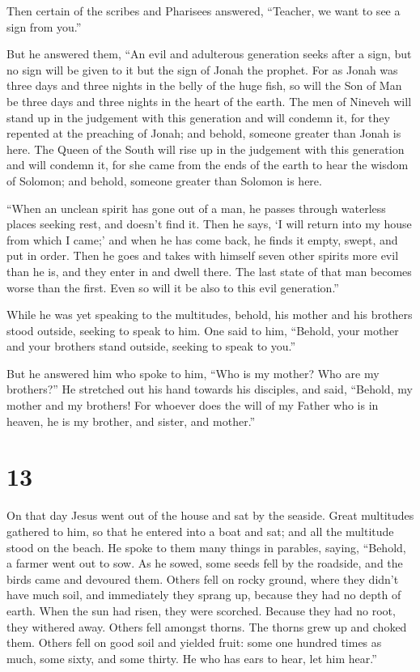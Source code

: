  Then certain of the scribes and Pharisees answered,
``Teacher, we want to see a sign from you.''

 But he answered them, ``An evil and adulterous generation
seeks after a sign, but no sign will be given to it but the sign of
Jonah the prophet.  For as Jonah was three days and three
nights in the belly of the huge fish, so will the Son of Man be three
days and three nights in the heart of the earth.  The men
of Nineveh will stand up in the judgement with this generation and will
condemn it, for they repented at the preaching of Jonah; and behold,
someone greater than Jonah is here.  The Queen of the South
will rise up in the judgement with this generation and will condemn it,
for she came from the ends of the earth to hear the wisdom of Solomon;
and behold, someone greater than Solomon is here.

 ``When an unclean spirit has gone out of a man, he passes
through waterless places seeking rest, and doesn't find it.
 Then he says, `I will return into my house from which I
came;' and when he has come back, he finds it empty, swept, and put in
order.  Then he goes and takes with himself seven other
spirits more evil than he is, and they enter in and dwell there. The
last state of that man becomes worse than the first. Even so will it be
also to this evil generation.''

 While he was yet speaking to the multitudes, behold, his
mother and his brothers stood outside, seeking to speak to him.
 One said to him, ``Behold, your mother and your brothers
stand outside, seeking to speak to you.''

 But he answered him who spoke to him, ``Who is my mother?
Who are my brothers?''  He stretched out his hand towards
his disciples, and said, ``Behold, my mother and my brothers!
 For whoever does the will of my Father who is in heaven,
he is my brother, and sister, and mother.''

\hypertarget{section-12}{%
\section{13}\label{section-12}}

 On that day Jesus went out of the house and sat by the
seaside.  Great multitudes gathered to him, so that he
entered into a boat and sat; and all the multitude stood on the beach.
 He spoke to them many things in parables, saying, ``Behold,
a farmer went out to sow.  As he sowed, some seeds fell by
the roadside, and the birds came and devoured them.  Others
fell on rocky ground, where they didn't have much soil, and immediately
they sprang up, because they had no depth of earth.  When
the sun had risen, they were scorched. Because they had no root, they
withered away.  Others fell amongst thorns. The thorns grew
up and choked them.  Others fell on good soil and yielded
fruit: some one hundred times as much, some sixty, and some thirty.
 He who has ears to hear, let him hear.''

